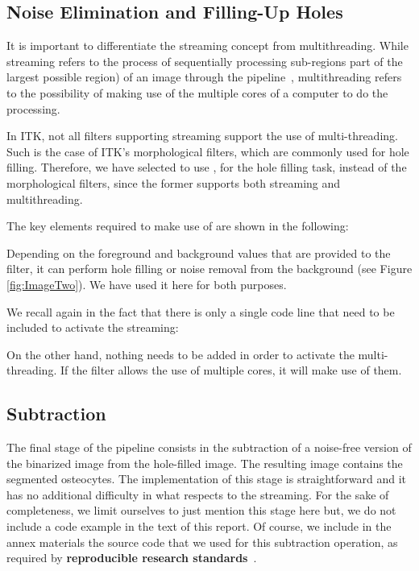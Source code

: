 \documentclass{InsightArticle}
\begin{document}
\subsection{Noise Elimination and Filling-Up Holes}
It is important to differentiate the streaming concept from multithreading. While
streaming refers to the process of sequentially processing sub-regions part of
the largest possible region) of an image through the pipeline~\cite{Lowekamp2010},
multithreading refers to the possibility of making use of the multiple cores of
a computer to do the processing.

In ITK, not all filters supporting streaming support the use of multi-threading.
Such is the case of ITK's morphological filters, which are commonly used for hole
filling. Therefore, we have selected to use ,
for the hole filling task, instead of the morphological filters, since the former
supports both streaming and multithreading.

The key elements required to make use of  
are shown in the following:

\begin{center}

\end{center}

Depending on the foreground and background values that are provided to the
filter, it can perform hole filling or noise removal from the background (see
Figure \ref{fig:ImageTwo}).  We have used it here for both purposes.

We recall again in the fact that there is only a single code line that
need to be included to activate the streaming:

\begin{center}

\end{center}

On the other hand, nothing needs to be added in order to activate the multi-threading.
If the filter allows the use of multiple cores, it will make use of them.

\subsection{Subtraction}
The final stage of the pipeline consists in the subtraction of  a noise-free
version of the binarized image from the hole-filled image. The resulting image contains the
segmented osteocytes. The implementation
of this stage is straightforward and it has no additional difficulty in what
respects to the streaming. For the sake of completeness, we limit ourselves to
just mention this stage here but, we do not include a code example in the text
of this report.  Of course, we include in the annex materials the source code
that we used for this subtraction operation, as required by
\textbf{reproducible research standards}~\cite{Stodden2009}.
\end{document}
